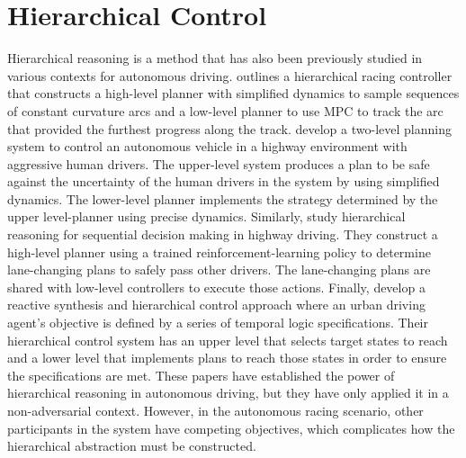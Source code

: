 \section{Hierarchical Control}
Hierarchical reasoning is a method that has also been previously studied in various contexts for autonomous driving. \citet{LinigerThesis} outlines a hierarchical racing controller that constructs a high-level planner with simplified dynamics to sample sequences of constant curvature arcs and a low-level planner to use MPC to track the arc that provided the furthest progress along the track. \citet{Fisac2019} develop a two-level planning system to control an autonomous vehicle in a highway environment with aggressive human drivers. The upper-level system produces a plan to be safe against the uncertainty of the human drivers in the system by using simplified dynamics. The lower-level planner implements the strategy determined by the upper level-planner using precise dynamics. Similarly, \citet{Moghadam2019} study hierarchical reasoning for sequential decision making in highway driving. They construct a high-level planner using a trained reinforcement-learning policy to determine lane-changing plans to safely pass other drivers. The lane-changing plans are shared with low-level controllers to execute those actions. Finally, \citet{Wongpiromsarn2012} develop a reactive synthesis and hierarchical control approach where an urban driving agent's objective is defined by a series of temporal logic specifications. Their hierarchical control system has an upper level that selects target states to reach and a lower level that implements plans to reach those states in order to ensure the specifications are met. These papers have established the power of hierarchical reasoning in autonomous driving, but they have only applied it in a non-adversarial context. However, in the autonomous racing scenario, other participants in the system have competing objectives, which complicates how the hierarchical abstraction must be constructed.